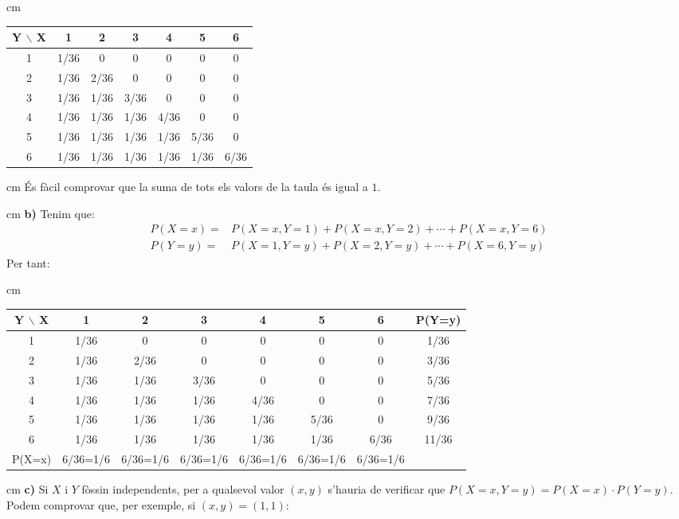 \documentclass{article}
\begin{document}
 cm
\begin{center}
\begin{tabular}{c|c|c|c|c|c|c|}
Y $\backslash$ X & 1 & 2 & 3 & 4 & 5 & 6  \\ \hline
1     & 1/36 &    0 &    0 &    0 &    0 & 0  \\ \hline
2     & 1/36 & 2/36 &    0 &    0 &    0 & 0  \\ \hline
3     & 1/36 & 1/36 & 3/36 &    0 &    0 & 0  \\ \hline
4     & 1/36 & 1/36 & 1/36 & 4/36 &    0 & 0  \\ \hline
5     & 1/36 & 1/36 & 1/36 & 1/36 & 5/36 & 0  \\ \hline
6     & 1/36 & 1/36 & 1/36 & 1/36 & 1/36 & 6/36  \\ \hline
\end{tabular}
\end{center}

 cm
\noindent
\'Es f\`acil comprovar que la suma de tots els valors de la taula \'es igual a $1$.

 cm
\noindent
\textbf{b)} Tenim que:
\[
\begin{array}{ll}
P(X=x)= & P(X=x, Y=1)+P(X=x, Y=2)+\cdots+P(X=x, Y=6) \\
P(Y=y)= & P(X=1, Y=y)+P(X=2, Y=y)+\cdots+P(X=6, Y=y)
\end{array}
\]
\noindent
Per tant:

 cm
\begin{center}
\begin{tabular}{c|c|c|c|c|c|c||c}
Y $\backslash$ X & 1 & 2 & 3 & 4 & 5 & 6 & P(Y=y) \\ \hline
1     & 1/36 &    0 &    0 &    0 &    0 & 0 & 1/36 \\ \hline
2     & 1/36 & 2/36 &    0 &    0 &    0 & 0 & 3/36 \\ \hline
3     & 1/36 & 1/36 & 3/36 &    0 &    0 & 0 & 5/36 \\ \hline
4     & 1/36 & 1/36 & 1/36 & 4/36 &    0 & 0 & 7/36 \\ \hline
5     & 1/36 & 1/36 & 1/36 & 1/36 & 5/36 & 0 & 9/36 \\ \hline
6     & 1/36 & 1/36 & 1/36 & 1/36 & 1/36 & 6/36 & 11/36 \\ \hline \hline
P(X=x) & 6/36=1/6 & 6/36=1/6 & 6/36=1/6 & 6/36=1/6 & 6/36=1/6 & 6/36=1/6 &  
\end{tabular}
\end{center}

 cm
\noindent
\textbf{c)} Si $X$ i $Y$ f\`ossin independents, per a qualsevol valor $(x, y)$
s'hauria de verificar que $P(X=x, Y=y)=P(X=x) \cdot P(Y=y)$. Podem comprovar
que, per exemple, si $(x, y)=(1, 1)$: 
\end{document}
